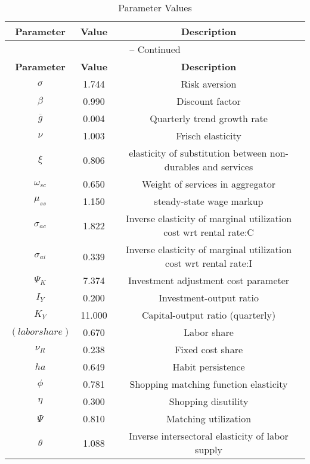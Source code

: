 \begin{center}
\begin{longtable}{ccc}
\caption{Parameter Values}\\%
\toprule%
\multicolumn{1}{c}{\textbf{Parameter}} &
\multicolumn{1}{c}{\textbf{Value}} &
 \multicolumn{1}{c}{\textbf{Description}}\\%
\midrule%
\endfirsthead
\multicolumn{3}{c}{{\tablename} \thetable{} -- Continued}\\%
\midrule%
\multicolumn{1}{c}{\textbf{Parameter}} &
\multicolumn{1}{c}{\textbf{Value}} &
  \multicolumn{1}{c}{\textbf{Description}}\\%
\midrule%
\endhead
${\sigma}$ 	 & 	 1.744 	 & 	 Risk aversion\\
${\beta}$ 	 & 	 0.990 	 & 	 Discount factor\\
${\overline{g}}$ 	 & 	 0.004 	 & 	 Quarterly trend growth rate\\
$\nu$ 	 & 	 1.003 	 & 	 Frisch elasticity\\
$\xi$ 	 & 	 0.806 	 & 	 elasticity of substitution between non-durables and services\\
$\omega_{sc}$ 	 & 	 0.650 	 & 	 Weight of services in aggregator\\
$\mu_{ss}$ 	 & 	 1.150 	 & 	 steady-state wage markup\\
${\sigma_{ac}}$ 	 & 	 1.822 	 & 	 Inverse elasticity of marginal utilization cost wrt rental rate:C\\
${\sigma_{ai}}$ 	 & 	 0.339 	 & 	 Inverse elasticity of marginal utilization cost wrt rental rate:I\\
${\Psi_{K}}$ 	 & 	 7.374 	 & 	 Investment adjustment cost parameter\\
${I_Y}$ 	 & 	 0.200 	 & 	 Investment-output ratio\\
${K_Y}$ 	 & 	 11.000 	 & 	 Capital-output ratio (quarterly)\\
$(labor share)$ 	 & 	 0.670 	 & 	 Labor share\\
${\nu_R}$ 	 & 	 0.238 	 & 	 Fixed cost share\\
${ha}$ 	 & 	 0.649 	 & 	 Habit persistence\\
${\phi}$ 	 & 	 0.781 	 & 	 Shopping matching function elasticity\\
${\eta}$ 	 & 	 0.300 	 & 	 Shopping disutility\\
${\Psi}$ 	 & 	 0.810 	 & 	 Matching utilization\\
${\theta}$ 	 & 	 1.088 	 & 	 Inverse intersectoral elasticity of labor supply\\

\end{longtable}
\end{center}
